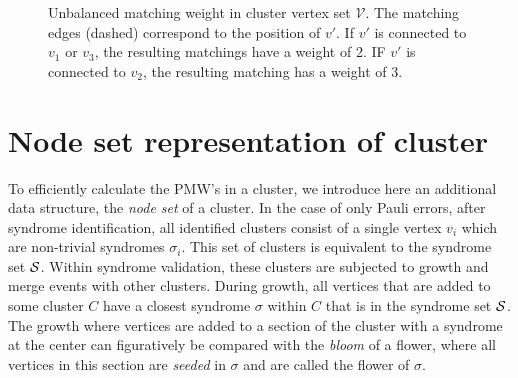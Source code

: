 \begin{figure}
  \centering
  \vspace{1em}
  \caption{Unbalanced matching weight in cluster vertex set $\mathcal{V}$. The matching edges (dashed) correspond to the position of $v'$. If $v'$ is connected to $v_1$ or $v_3$, the resulting matchings have a weight of 2. IF $v'$ is connected to $v_2$, the resulting matching has a weight of 3.}\label{fig:PMW}
\end{figure}

\section{Node set representation of cluster}\label{sec:nodeset}

To efficiently calculate the PMW's in a cluster, we introduce here an additional data structure, the \emph{node set} of a cluster. In the case of only Pauli errors, after syndrome identification, all identified clusters consist of a single vertex $v_i$ which are non-trivial syndromes $\sigma_i$. This set of clusters is equivalent to the syndrome set $\mathcal{S}$. Within syndrome validation, these clusters are subjected to growth and merge events with other clusters. During growth, all vertices that are added to some cluster $C$ have a closest syndrome $\sigma$ within $C$ that is in the syndrome set $\mathcal{S}$. The growth where vertices are added to a section of the cluster with a syndrome at the center can figuratively be compared with the \emph{bloom} of a flower, where all vertices in this section are \emph{seeded} in $\sigma$ and are called the flower of $\sigma$. 

